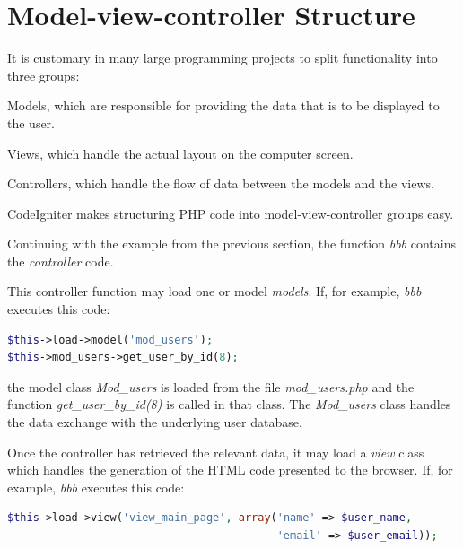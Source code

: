 \documentclass[11pt,oneside,a4paper]{memoir}
\begin{document}
\section{Model-view-controller Structure}

It is customary in many large programming projects to split functionality into three groups:

\begin{list}{-}{%
    \setlength{\itemsep}{0pt}%
    \setlength{\parsep}{0pt}%
    \setlength{\topsep}{\baselineskip}%
    \setlength{\partopsep}{0pt}%
  }
  \item Models, which are responsible for providing the data that is to be displayed to the user.
  \item Views, which handle the actual layout on the computer screen.
  \item Controllers, which handle the flow of data between the models and the views.
\end{list}

CodeIgniter makes structuring PHP code into model-view-controller groups easy.

Continuing with the example from the previous section, the function \emph{bbb} contains the
\emph{controller} code.

This controller function may load one or model \emph{models}. If, for example, \emph{bbb}
executes this code:

\begin{lstlisting}[language=PHP]
$this->load->model('mod_users');
$this->mod_users->get_user_by_id(8);
\end{lstlisting}

\noindent
the model class \emph{Mod\_users} is loaded from the file \emph{mod\_users.php} and the function
\emph{get\_\-user\_\-by\_\-id(8)} is called in that class. The \emph{Mod\_users} class handles the data
exchange with the underlying user database.

Once the controller has retrieved the relevant data, it may load a \emph{view} class which handles
the generation of the HTML code presented to the browser. If, for example, \emph{bbb} executes
this code:

\begin{lstlisting}[language=PHP]
$this->load->view('view_main_page', array('name' => $user_name,
                                          'email' => $user_email));
\end{lstlisting}
\end{document}
